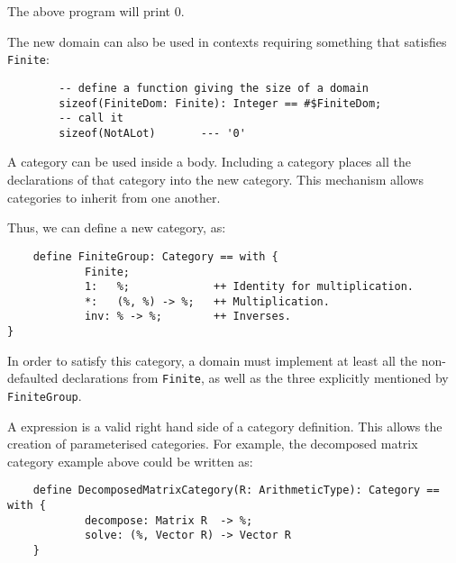 {The above program will print 0.

The new domain can also be used in contexts requiring something that
satisfies {\tt Finite}:

\begin{small}
\begin{verbatim}
        -- define a function giving the size of a domain
        sizeof(FiniteDom: Finite): Integer == #$FiniteDom;
        -- call it
        sizeof(NotALot)       --- '0' 
\end{verbatim}
\end{small}

A category can be used inside a  body. Including a
category places all the declarations of that category into the new
category. This mechanism allows categories to inherit from one another.

Thus, we can define a new category,  as:
\begin{small}
\begin{verbatim}
    define FiniteGroup: Category == with {
            Finite;
            1:   %;             ++ Identity for multiplication.
            *:   (%, %) -> %;   ++ Multiplication.
            inv: % -> %;        ++ Inverses.
}
\end{verbatim}
\end{small}

In order to satisfy this category, a domain must implement at least all
the non-defaulted declarations from {\tt Finite}, as well as the three
explicitly mentioned by {\tt FiniteGroup}.


A  expression is a valid right hand side of a category
definition. This allows the creation of parameterised categories. For
example, the decomposed matrix category example above could be written
as:

\begin{small}
\begin{verbatim}
    define DecomposedMatrixCategory(R: ArithmeticType): Category == with {
            decompose: Matrix R  -> %;
            solve: (%, Vector R) -> Vector R
    }
\end{verbatim}
\end{small}

}
